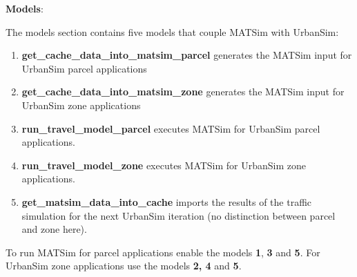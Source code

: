 \documentclass[a4paper,11pt]{report}
\begin{document}
\textbf{Models}:

The models section contains five models that couple MATSim with UrbanSim:
\begin{enumerate}
	\item \textbf{get\_cache\_data\_into\_matsim\_parcel} generates the MATSim input for UrbanSim parcel applications
	\item \textbf{get\_cache\_data\_into\_matsim\_zone} generates the MATSim input for UrbanSim zone applications
	\item \textbf{run\_travel\_model\_parcel }executes MATSim for UrbanSim parcel applications.
	\item \textbf{run\_travel\_model\_zone} executes MATSim for UrbanSim zone applications.
	\item \textbf{get\_matsim\_data\_into\_cache} imports the results of the traffic simulation for the next UrbanSim iteration (no distinction between parcel and zone here).
\end{enumerate}

To run MATSim for parcel applications enable the models \textbf{1},\textbf{ 3} and \textbf{5}. For UrbanSim zone applications use the models \textbf{2, 4} and \textbf{5}.
\end{document}
